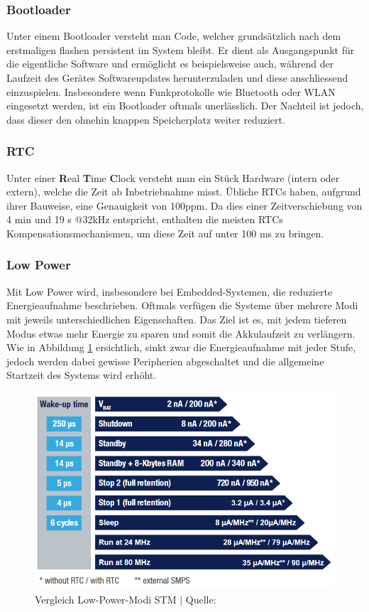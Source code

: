 \documentclass[12pt]{article}
\begin{document}
	\subsubsection*{Bootloader}
	Unter einem Bootloader versteht man Code, welcher grundsätzlich nach dem erstmaligen flashen persistent im System bleibt. Er dient als Ausgangspunkt für die eigentliche Software und ermöglicht es beispielsweise auch, während der Laufzeit des Gerätes Softwareupdates herunterzuladen und diese anschliessend einzuspielen. Insbesondere wenn Funkprotokolle wie Bluetooth oder WLAN eingesetzt werden, ist ein Bootloader oftmals unerlässlich. Der Nachteil ist jedoch, dass dieser den ohnehin knappen Speicherplatz weiter reduziert.
	\subsubsection*{RTC}
	Unter einer \textbf{R}eal \textbf{T}ime \textbf{C}lock versteht man ein Stück Hardware (intern oder extern), welche die Zeit ab Inbetriebnahme misst. Übliche RTCs haben, aufgrund ihrer Bauweise, eine Genauigkeit von 100ppm. Da dies einer Zeitverschiebung von 4 min und 19 s @32kHz entspricht, enthalten die meisten RTCs Kompensationsmechanismen, um diese Zeit auf unter 100 ms zu bringen. \cite{dighe_tps65950_2008}

	\subsubsection*{Low Power}
	Mit Low Power wird, insbesondere bei Embedded-Systemen, die reduzierte Energieaufnahme beschrieben. Oftmals verfügen die Systeme über mehrere Modi mit jeweils unterschiedlichen Eigenschaften. Das Ziel ist es, mit jedem tieferen Modus etwas mehr Energie zu sparen und somit die Akkulaufzeit zu verlängern. Wie in Abbildung  \ref{fig:batlow-power-modestm} ersichtlich, sinkt zwar die Energieaufnahme mit jeder Stufe, jedoch werden dabei gewisse Peripherien abgeschaltet und die allgemeine Startzeit des Systems wird erhöht.
	\begin{figure}[H]
		\centering
		\includegraphics[width=0.7\linewidth]{images/BAT_Low-Power-Mode_STM}
		\caption{Vergleich Low-Power-Modi STM $\vert$ Quelle: \cite{noauthor_stm32l4_2024}}
		\label{fig:batlow-power-modestm}
	\end{figure}
	
\end{document}
